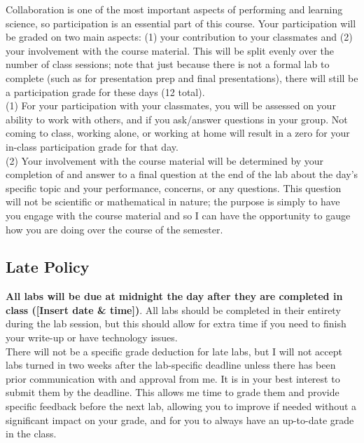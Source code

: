 \documentclass[11pt]{article}
\begin{document}
\noindent Collaboration is one of the most important aspects of performing and learning science, so participation is an essential part of this course. Your participation will be graded on two main aspects: (1) your contribution to your classmates and (2) your involvement with the course material. This will be split evenly over the number of class sessions; note that just because there is not a formal lab to complete (such as for presentation prep and final presentations), there will still be a participation grade for these days (12 total). \\

\label{participation1}
(1) For your participation with your classmates, you will be assessed on your ability to work with others, and if you ask/answer questions in your group. Not coming to class, working alone, or working at home will result in a zero for your in-class participation grade for that day. \\

\label{participation2}
(2) Your involvement with the course material will be determined by your completion of and answer to a final question at the end of the lab about the day's specific topic and your performance, concerns, or any questions. This question will not be scientific or mathematical in nature; the purpose is simply to have you engage with the course material and so I can have the opportunity to gauge how you are doing over the course of the semester.

\subsection*{Late Policy}

\noindent \textbf{All labs will be due at midnight the day after they are completed in class ([Insert date \& time])}. All labs should be completed in their entirety during the lab session, but this should allow for extra time if you need to finish your write-up or have technology issues. \\

There will not be a specific grade deduction for late labs, but I will not accept labs turned in two weeks after the lab-specific deadline unless there has been prior communication with and approval from me. It is in your best interest to submit them by the deadline. This allows me time to grade them and provide specific feedback before the next lab, allowing you to improve if needed without a significant impact on your grade, and for you to always have an up-to-date grade in the class. \\
\end{document}
